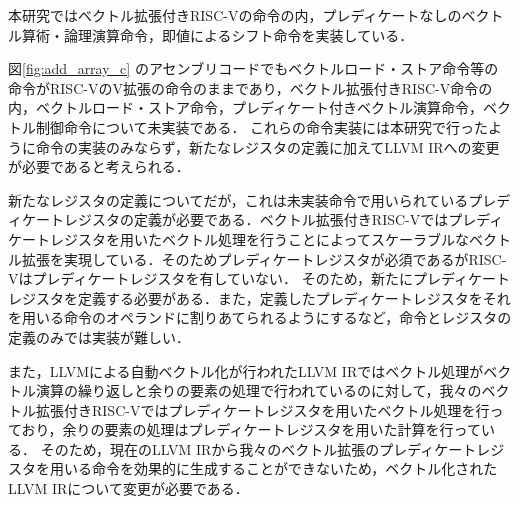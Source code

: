 
本研究ではベクトル拡張付きRISC-Vの命令の内，プレディケートなしのベクトル算術・論理演算命令，即値によるシフト命令を実装している．

図\ref{fig:add_array_c}
のアセンブリコードでもベクトルロード・ストア命令等の命令がRISC-VのV拡張の命令のままであり，ベクトル拡張付きRISC-V命令の内，ベクトルロード・ストア命令，プレディケート付きベクトル演算命令，ベクトル制御命令について未実装である．
これらの命令実装には本研究で行ったように命令の実装のみならず，新たなレジスタの定義に加えてLLVM IRへの変更が必要であると考えられる．

新たなレジスタの定義についてだが，これは未実装命令で用いられているプレディケートレジスタの定義が必要である．ベクトル拡張付きRISC-Vではプレディケートレジスタを用いたベクトル処理を行うことによってスケーラブルなベクトル拡張を実現している．そのためプレディケートレジスタが必須であるがRISC-Vはプレディケートレジスタを有していない．
そのため，新たにプレディケートレジスタを定義する必要がある．また，定義したプレディケートレジスタをそれを用いる命令のオペランドに割りあてられるようにするなど，命令とレジスタの定義のみでは実装が難しい．

また，LLVMによる自動ベクトル化が行われたLLVM IRではベクトル処理がベクトル演算の繰り返しと余りの要素の処理で行われているのに対して，我々のベクトル拡張付きRISC-Vではプレディケートレジスタを用いたベクトル処理を行っており，余りの要素の処理はプレディケートレジスタを用いた計算を行っている．
そのため，現在のLLVM IRから我々のベクトル拡張のプレディケートレジスタを用いる命令を効果的に生成することができないため，ベクトル化されたLLVM IRについて変更が必要である．